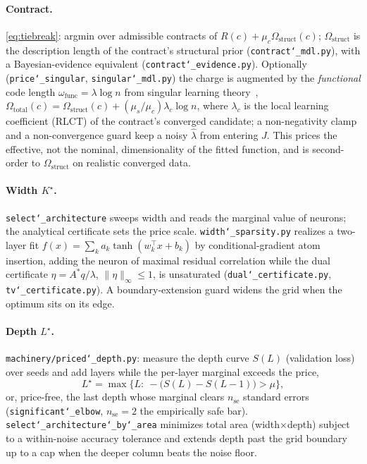 \documentclass[11pt]{article}
\newcommand{\allowbreakhere}{\discretionary{}{}{}}
\newcommand{\code}[1]{\texttt{\def\_{\char`_\allowbreakhere}#1}}
\newcommand{\Lstar}{L^{\star}}
\newcommand{\Kstar}{K^{\star}}
\begin{document}
\paragraph{Contract.} \eqref{eq:tiebreak}: argmin over admissible contracts of $R(c)+\mu_c\Omega_{\mathrm{struct}}(c)$;
$\Omega_{\mathrm{struct}}$ is the description length of the contract's structural prior
(\code{contract\_mdl.py}), with a Bayesian-evidence equivalent (\code{contract\_evidence.py}). Optionally
(\code{price\_singular}, \code{singular\_mdl.py}) the charge is augmented by the \emph{functional} code
length $\omega_{\mathrm{func}}=\lambda\log n$ from singular learning theory~\cite{lau2023llc,watanabe2009slt},
$\Omega_{\mathrm{total}}(c)=\Omega_{\mathrm{struct}}(c)+(\mu_s/\mu_c)\lambda_c\log n$, where $\lambda_c$ is
the local learning coefficient (RLCT) of the contract's converged candidate; a non-negativity clamp and a
non-convergence guard keep a noisy $\hat\lambda$ from entering $J$. This prices the effective, not the
nominal, dimensionality of the fitted function, and is second-order to $\Omega_{\mathrm{struct}}$ on
realistic converged data.

\paragraph{Width $\Kstar$.} \code{select\_architecture} sweeps width and reads the marginal value of neurons;
the analytical certificate sets the price scale. \code{width\_sparsity.py} realizes a two-layer fit
$f(x)=\sum_k a_k\tanh(w_k^\top x+b_k)$ by conditional-gradient atom insertion, adding the neuron of maximal
residual correlation while the dual certificate $\eta=A^\ast q/\lambda$, $\lVert\eta\rVert_\infty\le1$, is
unsaturated (\code{dual\_certificate.py}, \code{tv\_certificate.py}). A boundary-extension guard widens the
grid when the optimum sits on its edge.

\paragraph{Depth $\Lstar$.} \code{machinery/priced\_depth.py}: measure the depth curve $S(L)$ (validation
loss) over seeds and add layers while the per-layer marginal exceeds the price,
\begin{equation}
\label{eq:depth-rule}
\Lstar=\max\Big\{L:\ -\big(S(L)-S(L{-}1)\big) > \mu\Big\},
\end{equation}
or, price-free, the last depth whose marginal clears $n_{\mathrm{se}}$ standard errors
(\code{significant\_elbow}, $n_{\mathrm{se}}{=}2$ the empirically safe bar). \code{select\_architecture\_by\_area}
minimizes total area (width$\times$depth) subject to a within-noise accuracy tolerance and extends depth past
the grid boundary up to a cap when the deeper column beats the noise floor.
\end{document}
